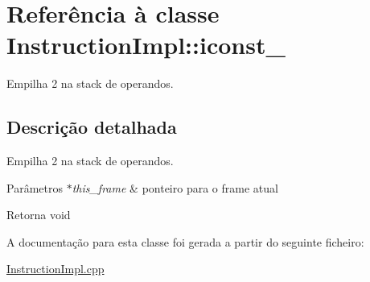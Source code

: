 \hypertarget{class_instruction_impl_1_1iconst__2}{}\section{Referência à classe Instruction\+Impl\+:\+:iconst\+\_}
\label{class_instruction_impl_1_1iconst__2}


Empilha 2 na stack de operandos.  




\subsection{Descrição detalhada}
Empilha 2 na stack de operandos. 


\begin{DoxyParams}{Parâmetros}
{\em $\ast$this\+\_\+frame} & ponteiro para o frame atual \\
\hline
\end{DoxyParams}
\begin{DoxyReturn}{Retorna}
void 
\end{DoxyReturn}


A documentação para esta classe foi gerada a partir do seguinte ficheiro\+:\begin{DoxyCompactItemize}
\item 
\hyperlink{_instruction_impl_8cpp}{Instruction\+Impl.\+cpp}\end{DoxyCompactItemize}
